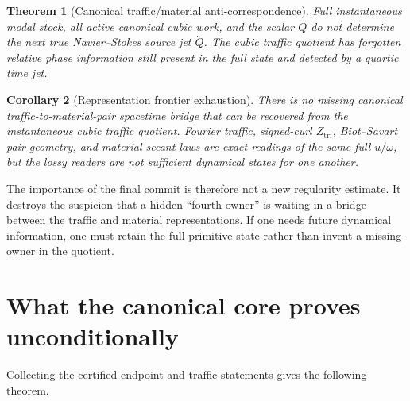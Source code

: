 \documentclass[11pt]{article}
\newtheorem{theorem}{Theorem}[section]
\newtheorem{corollary}[theorem]{Corollary}
\begin{document}
\begin{theorem}[Canonical traffic/material anti-correspondence]\label{thm:antiCorrespondence}
Full instantaneous modal stock, all active canonical cubic work, and the scalar $Q$ do not determine the next true Navier--Stokes source jet $\dot Q$.  The cubic traffic quotient has forgotten relative phase information still present in the full state and detected by a quartic time jet.
\end{theorem}

\begin{corollary}[Representation frontier exhaustion]\label{cor:repExhaustion}
There is no missing canonical traffic-to-material-pair spacetime bridge that can be recovered from the instantaneous cubic traffic quotient.  Fourier traffic, signed-curl $Z_{\mathrm{tri}}$, Biot--Savart pair geometry, and material secant laws are exact readings of the same full $u/\omega$, but the lossy readers are not sufficient dynamical states for one another.
\end{corollary}

The importance of the final commit is therefore not a new regularity estimate.  It destroys the suspicion that a hidden ``fourth owner'' is waiting in a bridge between the traffic and material representations.  If one needs future dynamical information, one must retain the full primitive state rather than invent a missing owner in the quotient.

\section{What the canonical core proves unconditionally}

Collecting the certified endpoint and traffic statements gives the following theorem.
\end{document}
